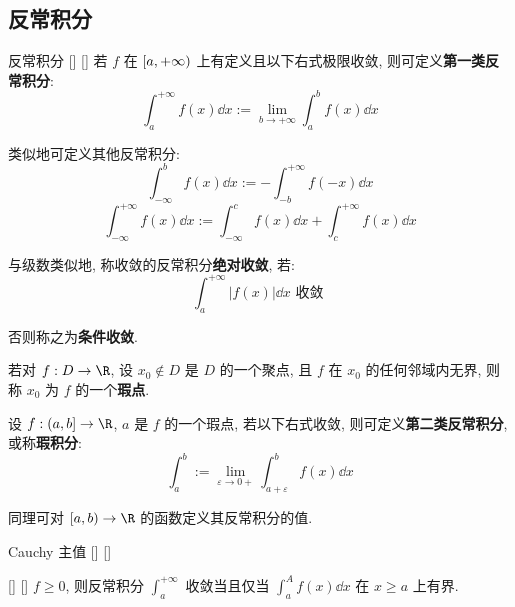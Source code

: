 \documentclass[UTF8]{ctexart}
\begin{document}
        \subsection{反常积分}
            
            \begin{dfn}
			    []
			    {反常积分}
			    []
			    []
                若 \(f\) 在 \(\Ico{a}{+\infty}\) 上有定义且以下右式极限收敛, 则可定义\textbf{第一类反常积分}: 
                \[\int_a^{+\infty}f(x)\dd x:=\lim_{b\to+\infty}\int_a^b f(x)\dd x\]

                类似地可定义其他反常积分: 
                \[\int_{-\infty}^b f(x)\dd x:=-\int_{-b}^{+\infty} f(-x)\dd x\]
                \[\int_{-\infty}^{+\infty} f(x)\dd x:=\int_{-\infty}^c f(x)\dd x+\int_c^{+\infty} f(x)\dd x\]

				与级数类似地, 称收敛的反常积分\textbf{绝对收敛}, 若: 
				\[\int_a^{+\infty}|f(x)|\dd x\text{ 收敛 }\]
				
				否则称之为\textbf{条件收敛}. 

				若对 \(f:D\to\R\), 设 \(x_0\notin D\) 是 \(D\) 的一个聚点, 且 \(f\) 在 \(x_0\) 的任何邻域内无界, 则称 \(x_0\) 为 \(f\) 的一个\textbf{瑕点}. 

				设 \(f:\Ioc{a}{b}\to\R\), \(a\) 是 \(f\) 的一个瑕点, 若以下右式收敛, 则可定义\textbf{第二类反常积分}, 或称\textbf{瑕积分}: 
				\[\int_a^b:=\lim_{\varepsilon\to 0+}\int_{a+\varepsilon}^b f(x)\dd x\]

				同理可对 \(\Ico{a}{b}\to\R\) 的函数定义其反常积分的值. 
            \end{dfn}
			
			\begin{dfn}
			    []
			    {Cauchy 主值}
			    []
			    []
			\end{dfn}
			
			\begin{thm}
				[]
				{}
				[]
				[]
				\(f\geq 0\), 则反常积分 \(\int_a^{+\infty}\) 收敛当且仅当 \(\int_a^A f(x)\dd x\) 在 \(x\geq a\) 上有界. 
			\end{thm}
\end{document}
